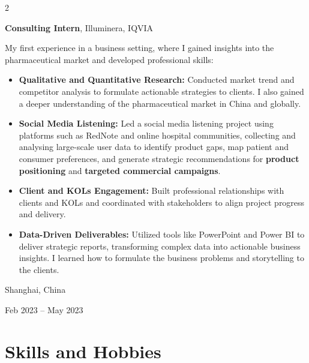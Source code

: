 \documentclass[10pt, letterpaper]{article}
\newenvironment{highlights}{
    \begin{itemize}[
        topsep=0.10 cm,
        parsep=0.10 cm,
        partopsep=0pt,
        itemsep=0pt,
        leftmargin=0.4 cm + 10pt
    ]
}{
    \end{itemize}
}
\newenvironment{twocolentry}[2][]{
    \onecolentry
    \def\secondColumn{#2}
    \setcolumnwidth{\fill, 4.5 cm}
    \begin{paracol}{2}
}{
    \switchcolumn \raggedleft \secondColumn
    \end{paracol}
    \endonecolentry
}
\begin{document}
        \begin{twocolentry}{
    Shanghai, China

    Feb 2023 -- May 2023
}
    \textbf{Consulting Intern}, Illuminera, IQVIA

    \vspace{0.1cm}

    My first experience in a business setting, where I gained insights into the pharmaceutical market and developed professional skills:

    \begin{highlights}
        \item \textbf{Qualitative and Quantitative Research:} Conducted market trend and competitor analysis to formulate actionable strategies to clients. I also gained a deeper understanding of the pharmaceutical market in China and globally.

        \vspace{0.1cm}

        \item \textbf{Social Media Listening:} Led a social media listening project using platforms such as RedNote and online hospital communities, collecting and analysing large-scale user data to identify product gaps, map patient and consumer preferences, and generate strategic recommendations for \textbf{product positioning} and \textbf{targeted commercial campaigns}.

        \vspace{0.1cm}

        \item \textbf{Client and KOLs Engagement:} Built professional relationships with clients and KOLs and coordinated with stakeholders to align project progress and delivery.

        \vspace{0.1cm}

        \item \textbf{Data-Driven Deliverables:} Utilized tools like PowerPoint and Power BI to deliver strategic reports, transforming complex data into actionable business insights. I learned how to formulate the business problems and storytelling to the clients.
    \end{highlights}
\end{twocolentry}

        \vspace{0.3 cm}


    \section{Skills and Hobbies}
\end{document}
